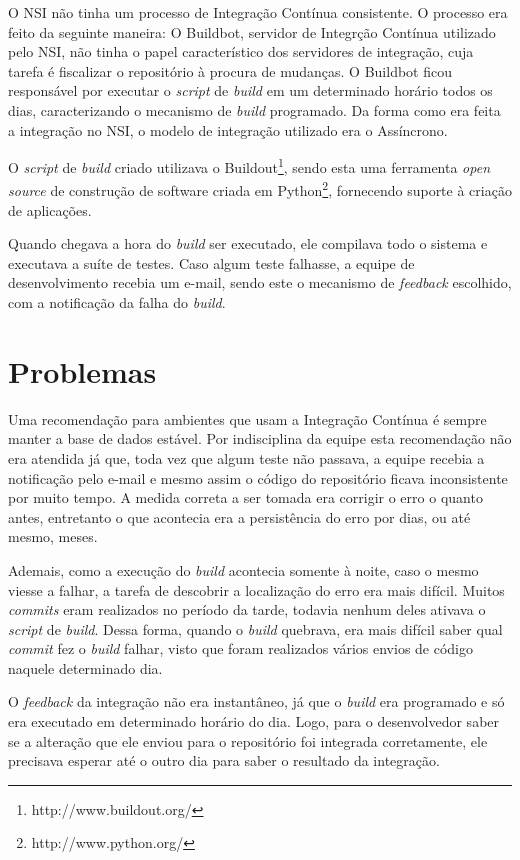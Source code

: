 O NSI não tinha um processo de Integração Contínua consistente. O processo era feito da seguinte maneira: O Buildbot, servidor de Integrção Contínua utilizado pelo NSI, não tinha o papel característico dos servidores de integração, cuja tarefa é fiscalizar o repositório à procura de mudanças. O Buildbot ficou responsável por executar o \textit{script} de \textit{build} em um determinado horário todos os dias, caracterizando o mecanismo de \textit{build} programado. Da forma como era feita a integração no NSI, o modelo de integração utilizado era o Assíncrono.

O \textit{script} de \textit{build} criado utilizava o Buildout\footnote{http://www.buildout.org/}, sendo esta uma ferramenta \textit{open source} de construção de software criada em Python\footnote{http://www.python.org/}, fornecendo suporte à criação de aplicações.

Quando chegava a hora do \textit{build} ser executado, ele compilava todo o sistema e executava a suíte de testes. Caso algum teste falhasse, a equipe de desenvolvimento recebia um e-mail, sendo este o mecanismo de \textit{feedback} escolhido, com a notificação da falha do \textit{build}.

\section{Problemas}

Uma recomendação para ambientes que usam a Integração Contínua é sempre manter a base de dados estável. Por indisciplina da equipe esta recomendação não era atendida já que, toda vez que algum teste não passava, a equipe recebia a notificação pelo e-mail e mesmo assim o código do repositório ficava inconsistente por muito tempo. A medida correta a ser tomada era corrigir o erro o quanto antes, entretanto o que acontecia era a persistência do erro por dias, ou até mesmo, meses.

Ademais, como a execução do \textit{build} acontecia somente à noite, caso o mesmo viesse a falhar, a tarefa de descobrir a localização do erro era mais difícil. Muitos \textit{commits} eram realizados no período da tarde, todavia nenhum deles ativava o \textit{script} de \textit{build}. Dessa forma, quando o \textit{build} quebrava, era mais difícil saber qual \textit{commit} fez o \textit{build} falhar, visto que foram realizados vários envios de código naquele determinado dia.

O \textit{feedback} da integração não era instantâneo, já que o \textit{build} era programado e só era executado em determinado horário do dia. Logo, para o desenvolvedor saber se a alteração que ele enviou para o repositório foi integrada corretamente, ele precisava esperar até o outro dia para saber o resultado da integração.

